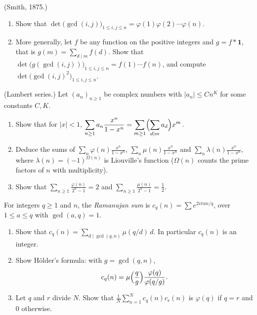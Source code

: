 \begin{exercise}[$\star\star$]\label{pb:smith}
(Smith, 1875.)
\begin{enumerate}[label=(\alph*)]
\item Show that $\det\bigl(\gcd(i,j)\bigr)_{1\le i,j\le n}=\varphi(1)\varphi(2)\cdots\varphi(n)$.
\item More generally, let $f$ be any function on the positive integers and $g=f*\mathbf1$, that is $g(m)=\sum_{d\mid m}f(d)$.
Show that $\det\bigl(g(\gcd(i,j))\bigr)_{1\le i,j\le n}=f(1)\cdots f(n)$, and compute $\det\bigl(\gcd(i,j)^2\bigr)_{1\le i,j\le n}$.
\end{enumerate}
\end{exercise}

\begin{exercise}[$\star\star$]\label{pb:lambert}
(Lambert series.) Let $(a_n)_{n\ge1}$ be complex numbers with $|a_n|\le Cn^K$ for some constants $C,K$.
\begin{enumerate}[label=(\alph*)]
\item Show that for $|x|<1$, $\displaystyle\sum_{n\ge1}a_n\frac{x^n}{1-x^n}=\sum_{m\ge1}\Bigl(\sum_{d\mid m}a_d\Bigr)x^m$.
\item Deduce the sums of $\sum_n\varphi(n)\frac{x^n}{1-x^n}$, $\sum_n\mu(n)\frac{x^n}{1-x^n}$ and $\sum_n\lambda(n)\frac{x^n}{1-x^n}$,
where $\lambda(n)=(-1)^{\Omega(n)}$ is Liouville's function ($\Omega(n)$ counts the prime factors of $n$ with multiplicity).
\item Show that $\displaystyle\sum_{n\ge1}\frac{\varphi(n)}{2^n-1}=2$ and $\displaystyle\sum_{n\ge1}\frac{\mu(n)}{2^n-1}=\frac12$.
\end{enumerate}
\end{exercise}

\begin{exercise}[$\star\star$]\label{pb:ramsum}
For integers $q\ge1$ and $n$, the \emph{Ramanujan sum} is $c_q(n)=\sum e^{2i\pi an/q}$, over $1\le a\le q$ with
$\gcd(a,q)=1$.
\begin{enumerate}[label=(\alph*)]
\item Show that $c_q(n)=\sum_{d\mid\gcd(q,n)}\mu(q/d)\,d$. In particular $c_q(n)$ is an integer.
\item Show Hölder's formula: with $g=\gcd(q,n)$,
\[
c_q(n)=\mu\Bigl(\frac qg\Bigr)\frac{\varphi(q)}{\varphi(q/g)}.
\]
\item Let $q$ and $r$ divide $N$. Show that $\frac1N\sum_{n=1}^Nc_q(n)c_r(n)$ is $\varphi(q)$ if $q=r$ and $0$ otherwise.
\end{enumerate}
\end{exercise}

